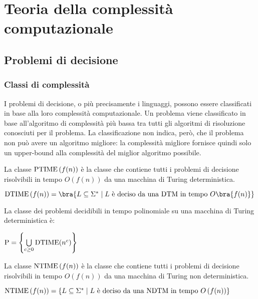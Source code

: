 \chapter{Teoria della complessità computazionale}
\section{Problemi di decisione}
\subsection*{Classi di complessità}
I problemi di decisione, o più precisamente i linguaggi, possono essere
classificati in base alla loro complessità computazionale. Un problema viene
classificato in base all'algoritmo di complessità più bassa tra tutti gli
algoritmi di risoluzione conosciuti per il problema.
La classificazione non indica, però, che il problema non può avere un algoritmo
migliore: la complessità migliore fornisce quindi solo un upper-bound alla
complessità del miglior algoritmo possibile.

\begin{thm}
    La classe $\textnormal{PTIME} \left( f(n) \right)$ è la classe che contiene
    tutti i problemi di decisione risolvibili in tempo $O(f(n))$ da una macchina
    di Turing deterministica.
    \begin{center}
        $\textnormal{DTIME} \left( f(n) \right) =
        \bra{ L \subseteq \Sigma^* \; | \; L \textnormal{ è deciso da una DTM in tempo } O \bra{ f(n) }}$
    \end{center}
\end{thm}

\begin{rem}
    La classe dei problemi decidibili in tempo polinomiale su una macchina di Turing deterministica è:
    \begin{center}
        $\textnormal{P} = \left\{ \bigcup\limits_{c \ge 0} \textnormal{DTIME}(n^c) \right\}$
    \end{center}
\end{rem}

\begin{thm}
    La classe $\textnormal{NTIME} \left( f(n) \right)$ è la classe che contiene tutti i problemi di decisione risolvibili in tempo $O(f(n))$ da una macchina di Turing non deterministica.
    \begin{center}
        $\textnormal{NTIME} \left( f(n) \right) = \left\{ L \subseteq \Sigma^* \; | \; L \textnormal{ è deciso da una NDTM in tempo } O \left( f(n) \right) \right\}$
    \end{center}
\end{thm}

